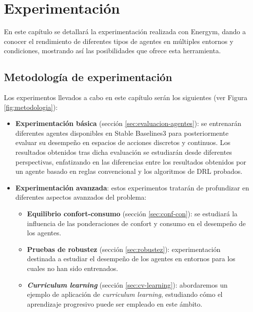 \chapter{Experimentación}
\label{ch:4}

En este capítulo se detallará la experimentación realizada con Energym, dando a conocer el rendimiento de diferentes tipos de agentes en múltiples entornos y condiciones, mostrando así las posibilidades que ofrece esta herramienta.

\section{Metodología de experimentación}

Los experimentos llevados a cabo en este capítulo serán los siguientes (ver Figura \ref{fig:metodologia}):

\begin{itemize}
    \item \textbf{Experimentación básica} (sección \ref{sec:evaluacion-agentes}): se entrenarán diferentes agentes disponibles en Stable Baselines3 para posteriormente evaluar su desempeño en espacios de acciones discretos y continuos. Los resultados obtenidos tras dicha evaluación se estudiarán desde diferentes perspectivas, enfatizando en las diferencias entre los resultados obtenidos por un agente basado en reglas convencional y los algoritmos de DRL probados.
    \item \textbf{Experimentación avanzada}: estos experimentos tratarán de profundizar en diferentes aspectos avanzados del problema:
        \begin{itemize}
            \item \textbf{Equilibrio confort-consumo} (sección \ref{sec:conf-con}): se estudiará la influencia de las ponderaciones de confort y consumo en el desempeño de los agentes.
            \item \textbf{Pruebas de robustez} (sección \ref{sec:robustez}): experimentación destinada a estudiar el desempeño de los agentes en entornos para los cuales no han sido entrenados.
            \item \textbf{\textit{Curriculum learning}} (sección \ref{sec:cv-learning}): abordaremos un ejemplo de aplicación de \textit{curriculum learning}, estudiando cómo el aprendizaje progresivo puede ser empleado en este ámbito.
        \end{itemize}
\end{itemize}

